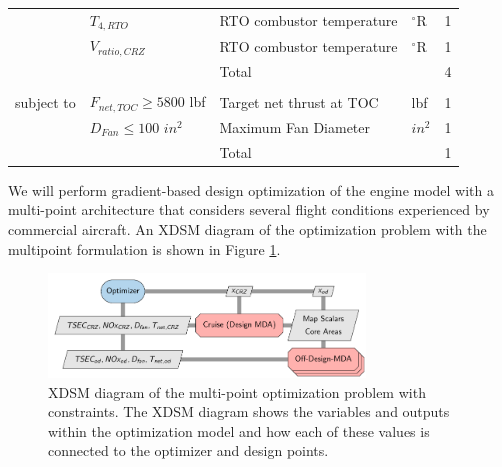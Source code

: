 \documentclass[conf]{new-aiaa}
\begin{document}
\begin{table}[h]
\begin{tabular}{r l l l l}
                        & $T_{4,RTO}$                 & RTO combustor temperature                   & $^\circ$R       & 1        \\
                        & $V_{ratio,CRZ}$             & RTO combustor temperature                   & $^\circ$R       & 1        \\
        \cline{3-5}
                        &                             & Total                                       &                 & 4        \\
                        &                             &                                             &                 &          \\
        subject to      & $F_{net,TOC} \geq 5800$ lbf & Target net thrust at TOC                    & lbf             & 1        \\
                        & $D_{Fan} \leq 100$ $in^2$   & Maximum Fan Diameter                        & $in^2$          & 1        \\
        \cline{3-5}
                        &                             & Total                                       &                 & 1        \\
        \bottomrule
    \end{tabular}
    \label{tab:opt_problem}
\end{table}


We will perform gradient-based design optimization of the engine model with a multi-point architecture that considers several flight conditions experienced by commercial aircraft.
An XDSM diagram of the optimization problem with the multipoint formulation is shown in Figure \ref{fig:opt_prob}.

\begin{figure}[hbt!]
    \centering
    \includegraphics[width=0.75\textwidth]{N3_inject.pdf}
    \caption{XDSM diagram of the multi-point optimization problem with constraints.
        The XDSM diagram shows the variables and outputs within the optimization model and how each of these values is connected to the optimizer and design points.}
    \label{fig:opt_prob}
\end{figure}
\end{document}
